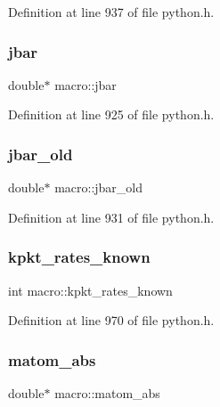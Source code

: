 Definition at line 937 of file python.\+h.

\mbox{\label{structmacro_ae726f77ad64bda6f946406ee648bfeb7}} 
\subsubsection{\texorpdfstring{jbar}{jbar}}
{\footnotesize\ttfamily double$\ast$ macro\+::jbar}



Definition at line 925 of file python.\+h.

\mbox{\label{structmacro_a517e7721172c08c80b4f8a1b20274385}} 
\subsubsection{\texorpdfstring{jbar\+\_\+old}{jbar\_old}}
{\footnotesize\ttfamily double$\ast$ macro\+::jbar\+\_\+old}



Definition at line 931 of file python.\+h.

\mbox{\label{structmacro_a22a281cdcc628db94cb49e1596802c2f}} 
\subsubsection{\texorpdfstring{kpkt\+\_\+rates\+\_\+known}{kpkt\_rates\_known}}
{\footnotesize\ttfamily int macro\+::kpkt\+\_\+rates\+\_\+known}



Definition at line 970 of file python.\+h.

\mbox{\label{structmacro_a5a30021fa093059f407675bfde840b34}} 
\subsubsection{\texorpdfstring{matom\+\_\+abs}{matom\_abs}}
{\footnotesize\ttfamily double$\ast$ macro\+::matom\+\_\+abs}



